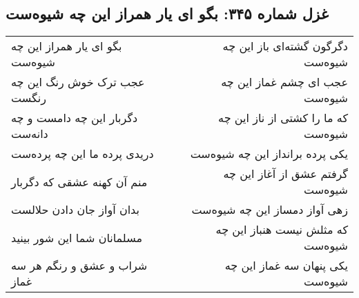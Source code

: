 \begin{center}
\section*{غزل شماره ۳۴۵: بگو ای یار همراز این چه شیوه‌ست}
\label{sec:0345}
\begin{longtable}{l p{0.5cm} r}
بگو ای یار همراز این چه شیوه‌ست
&&
دگرگون گشته‌ای باز این چه شیوه‌ست
\\
عجب ترک خوش رنگ این چه رنگست
&&
عجب ای چشم غماز این چه شیوه‌ست
\\
دگربار این چه دامست و چه دانه‌ست
&&
که ما را کشتی از ناز این چه شیوه‌ست
\\
دریدی پرده ما این چه پرده‌ست
&&
یکی پرده برانداز این چه شیوه‌ست
\\
منم آن کهنه عشقی که دگربار
&&
گرفتم عشق از آغاز این چه شیوه‌ست
\\
بدان آواز جان دادن حلالست
&&
زهی آواز دمساز این چه شیوه‌ست
\\
مسلمانان شما این شور بینید
&&
که مثلش نیست هنباز این چه شیوه‌ست
\\
شراب و عشق و رنگم هر سه غماز
&&
یکی پنهان سه غماز این چه شیوه‌ست
\\
\end{longtable}
\end{center}
